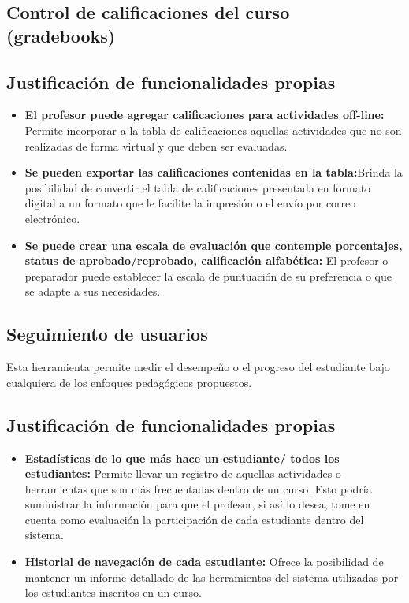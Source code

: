 \subsection{Control de calificaciones del curso (gradebooks)}

\subsection*{Justificación de funcionalidades propias}

\begin{itemize}

\item \textbf{El profesor puede agregar calificaciones para actividades off-line:} Permite incorporar a la tabla de calificaciones aquellas actividades que no son realizadas de forma virtual y que deben ser evaluadas.

\item \textbf{Se pueden exportar las calificaciones contenidas en la tabla:}Brinda la posibilidad de convertir el tabla de calificaciones presentada en formato digital a un formato que le facilite la impresión o el envío por correo electrónico.

\item \textbf{Se puede crear una escala de evaluación que contemple porcentajes, status de aprobado/reprobado, calificación alfabética:} El profesor o preparador puede establecer la escala de puntuación de su preferencia o que se adapte a sus necesidades. 

\end{itemize}

\subsection{Seguimiento de usuarios}
Esta herramienta permite medir el desempeño o el progreso del estudiante bajo cualquiera de los enfoques pedagógicos propuestos.


\subsection*{Justificación de funcionalidades propias}

\begin{itemize}

\item \textbf{Estadísticas de lo que más hace un estudiante/ todos los estudiantes:} Permite llevar un registro de aquellas actividades o herramientas que son más frecuentadas dentro de un curso. Esto podría suministrar la información para que el profesor, si así lo desea, tome en cuenta como evaluación la participación de cada estudiante dentro del sistema.

\item \textbf{Historial de navegación de cada estudiante:} Ofrece la posibilidad de mantener un informe detallado de las herramientas del sistema utilizadas por los estudiantes inscritos en un curso.

\end{itemize}

